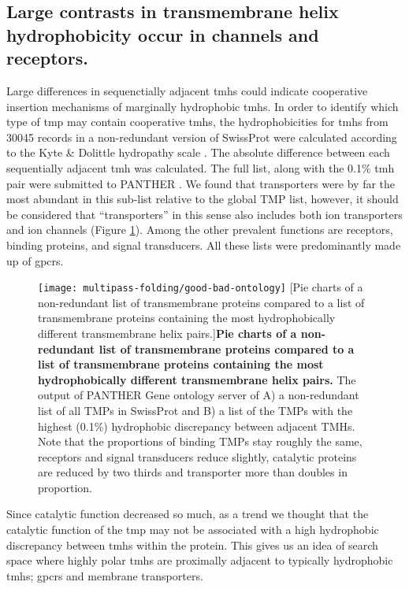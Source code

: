 \subsection{Large contrasts in transmembrane helix hydrophobicity occur in channels and receptors.}
Large differences in sequenctially adjacent \gls{tmh}s could indicate cooperative insertion mechanisms of marginally hydrophobic \gls{tmh}s.
In order to identify which type of \gls{tmp} may contain cooperative \gls{tmh}s, the hydrophobicities for \gls{tmh}s from 30045 records in a non-redundant version of SwissProt were calculated according to the Kyte \& Dolittle hydropathy scale \cite{Kyte1982}.
The absolute difference between each sequentially adjacent \gls{tmh} was calculated.
The full list, along with the 0.1\% \gls{tmh} pair were submitted to PANTHER \cite{Mi2017}.
We found that transporters were by far the most abundant in this sub\--list relative to the global TMP list, however, it should be considered that ``transporters'' in this sense also includes both ion transporters and ion channels (Figure \ref{fig:good-bad-ontology}).
Among the other prevalent functions are receptors, binding proteins, and signal transducers.
All these lists were predominantly made up of \gls{gpcr}s.


\begin{figure}[!ht]
\centering
\texttt{[image: multipass-folding/good-bad-ontology]}
		[Pie charts of a non-redundant list of transmembrane proteins compared to a list of transmembrane proteins containing the most hydrophobically different transmembrane helix pairs.]{\textbf{Pie charts of a non-redundant list of transmembrane proteins compared to a list of transmembrane proteins containing the most hydrophobically different transmembrane helix pairs.}
    The output of PANTHER Gene ontology server of A) a non-redundant list of all TMPs in SwissProt and
    B) a list of the TMPs with the highest (0.1\%) hydrophobic discrepancy between adjacent TMHs.
    Note that the proportions of binding TMPs stay roughly the same, receptors and signal transducers reduce slightly, catalytic proteins are reduced by two thirds and transporter more than doubles in proportion.
    }

\label{fig:good-bad-ontology}
\end{figure}

Since catalytic function decreased so much, as a trend we thought that the catalytic function of the \gls{tmp} may not be associated with a high hydrophobic discrepancy between \gls{tmh}s within the protein.
This gives us an idea of search space where highly polar \gls{tmh}s are proximally adjacent to typically hydrophobic \gls{tmh}s; \gls{gpcr}s and membrane transporters.

